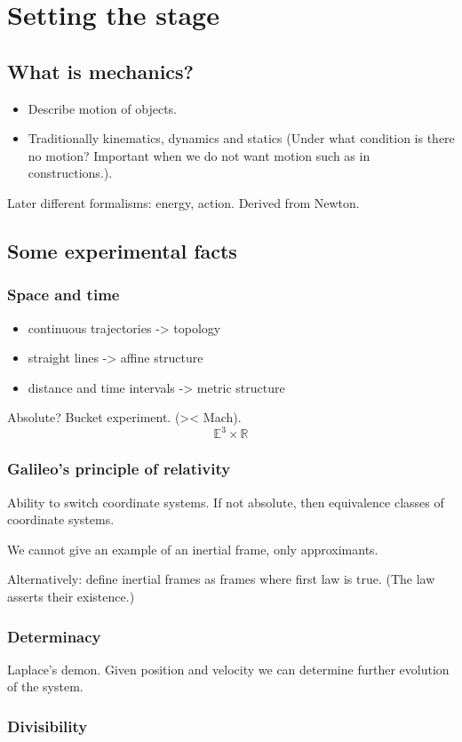 \chapter{Setting the stage}
\section{What is mechanics?}
\begin{itemize}
\item Describe motion of objects.
\item Traditionally kinematics, dynamics and statics (Under what condition is there no motion? Important when we do not want motion such as in constructions.).
\end{itemize}
Later different formalisms:
energy, action. Derived from Newton.
\section{Some experimental facts}
\subsection{Space and time}
\begin{itemize}
\item continuous trajectories -> topology
\item straight lines -> affine structure
\item distance and time intervals -> metric structure
\end{itemize}
Absolute? Bucket experiment. (>< Mach).
\[ \mathbb{E}^3\times\mathbb{R} \]
\subsection{Galileo's principle of relativity}
Ability to switch coordinate systems.
If not absolute, then equivalence classes of coordinate systems.
 
We cannot give an example of an inertial frame, only approximants.
 
Alternatively: define inertial frames as frames where first law is true. (The law asserts their existence.)
\subsection{Determinacy}
Laplace's demon. Given position and velocity we can determine further evolution of the system.

\subsection{Divisibility}

